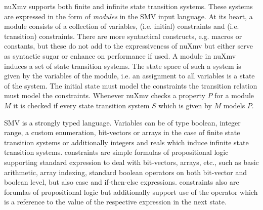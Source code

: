 nuXmv supports both finite and infinite state transition systems.
These systems are expressed in the form of \textit{modules} in the SMV input language.
At its heart, a module consists of a collection of variables,  (i.e. initial) constraints and  (i.e. transition) constraints.
There are more syntactical constructs, e.g. macros or constants, but these do not add to the expressiveness of nuXmv but either serve as syntactic sugar or enhance on performance if used.
A module in nuXmv induces a set of state transition systems.
The state space of such a system is given by the variables of the module, i.e. an assignment to all variables is a state of the system.
The initial state must model the  constraints the transition relation must model the  constraints.
Whenever nuXmv checks a property $ P $ for a module $ M $ it is checked if every state transition system $ S $ which is given by $ M $ models $ P $.

SMV is a strongly typed language.
Variables can be of type boolean, integer range, a custom enumeration, bit-vectors or arrays in the case of finite state transition systems or additionally integers and reals which induce infinite state transition systems.
 constraints are simple formulas of propositional logic supporting standard expression to deal with bit-vectors, arrays, etc., such as basic arithmetic, array indexing, standard boolean operators on both bit-vector and boolean level, but also case and if-then-else expressions.
 constraints also are forumlas of propositional logic but additionally support use of the  operator which is a reference to the value of the respective expression in the next state.

